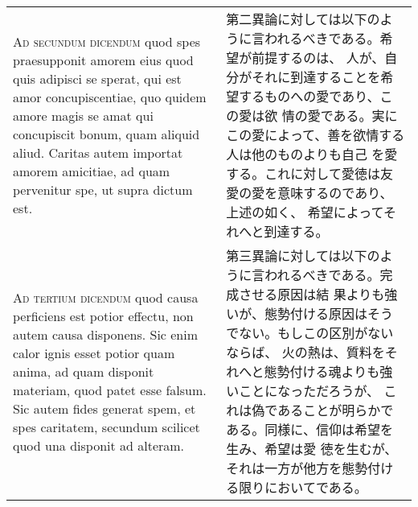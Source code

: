 \documentclass[10pt]{jsarticle}
\begin{document}
\begin{longtable}{p{21em}p{21em}}
 \\



 {\scshape Ad secundum dicendum} quod spes praesupponit amorem eius
 quod quis adipisci se sperat, qui est amor concupiscentiae, quo
 quidem amore magis se amat qui concupiscit bonum, quam aliquid
 aliud. Caritas autem importat amorem amicitiae, ad quam pervenitur
 spe, ut supra dictum est.


 &

 第二異論に対しては以下のように言われるべきである。希望が前提するのは、
 人が、自分がそれに到達することを希望するものへの愛であり、この愛は欲
 情の愛である。実にこの愛によって、善を欲情する人は他のものよりも自己
 を愛する。これに対して愛徳は友愛の愛を意味するのであり、上述の如く、
 希望によってそれへと到達する。

 \\



 {\scshape Ad tertium dicendum} quod causa perficiens est potior
 effectu, non autem causa disponens. Sic enim calor ignis esset potior
 quam anima, ad quam disponit materiam, quod patet esse falsum. Sic
 autem fides generat spem, et spes caritatem, secundum scilicet quod
 una disponit ad alteram.

 &

 第三異論に対しては以下のように言われるべきである。完成させる原因は結
 果よりも強いが、態勢付ける原因はそうでない。もしこの区別がないならば、
 火の熱は、質料をそれへと態勢付ける魂よりも強いことになっただろうが、
 これは偽であることが明らかである。同様に、信仰は希望を生み、希望は愛
 徳を生むが、それは一方が他方を態勢付ける限りにおいてである。

\end{longtable}
\end{document}
